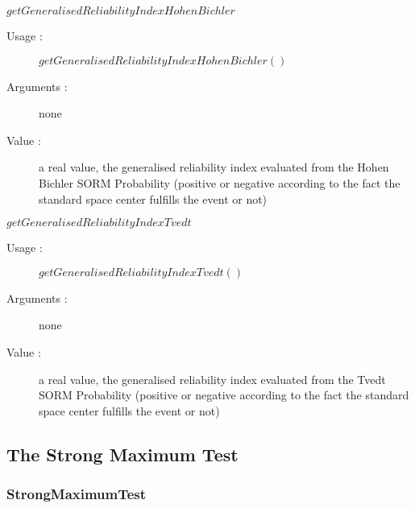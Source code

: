 \begin{description}
\begin{description}
  \item $getGeneralisedReliabilityIndexHohenBichler$
    \begin{description}
    \item[Usage :] $getGeneralisedReliabilityIndexHohenBichler()$
    \item[Arguments :] none
    \item[Value :]  a  real value, the generalised reliability index evaluated from the Hohen Bichler SORM Probability (positive or negative according to the fact the standard space center fulfills the event or not)
    \end{description}
    \bigskip

  \item $getGeneralisedReliabilityIndexTvedt$
    \begin{description}
    \item[Usage :] $getGeneralisedReliabilityIndexTvedt()$
    \item[Arguments :] none
    \item[Value :]  a  real value, the generalised reliability index evaluated from the Tvedt SORM Probability (positive or negative according to the fact the standard space center fulfills the event or not)
    \end{description}
    \bigskip
  \end{description}


\end{description}





\newpage \subsection{The Strong Maximum Test}

\subsubsection{StrongMaximumTest}



